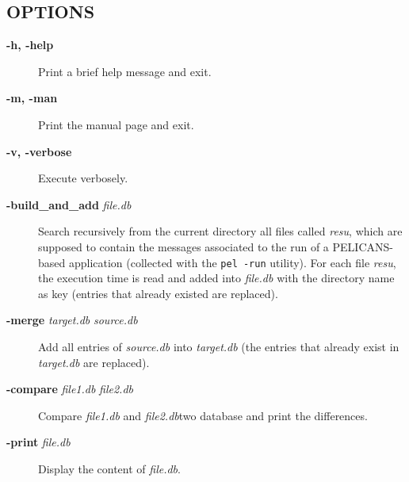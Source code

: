 \documentclass{article}
\begin{document}
\subsection*{OPTIONS\label{time_OPTIONS}}
\begin{description}

\item[\textbf{-h, -help}] \mbox{}

Print a brief help message and exit.


\item[\textbf{-m, -man}] \mbox{}

Print the manual page and exit.


\item[\textbf{-v, -verbose}] \mbox{}

Execute verbosely.


\item[\textbf{-build\_and\_add} \emph{file.db}] \mbox{}

Search recursively from the current directory all
files called \emph{resu}, which are supposed to contain the messages
associated to the run of a PELICANS-based application (collected
with the \texttt{pel -run} utility). For each file \emph{resu}, the execution time
is read and added into \emph{file.db} with the directory name as key (entries
that already existed are replaced).


\item[\textbf{-merge} \emph{target.db} \emph{source.db}] \mbox{}

Add all entries of \emph{source.db} into \emph{target.db}
(the entries that already exist in \emph{target.db} are replaced).


\item[\textbf{-compare} \emph{file1.db} \emph{file2.db}] \mbox{}

Compare \emph{file1.db} and \emph{file2.db}two database and print 
the differences.


\item[\textbf{-print} \emph{file.db}] \mbox{}

Display the content of \emph{file.db}.

\end{description}
\end{document}
